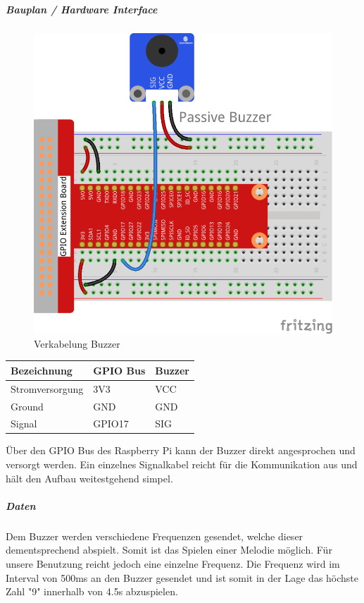 \documentclass[../../main.tex]{subfiles}
\begin{document}
\subparagraph{Bauplan / Hardware Interface}

\begin{figure}[H] \centering
  \includegraphics{VerkabelungAkustik}
  \caption{Verkabelung Buzzer}
  \label{fig:Buzzer}
\end{figure}

\begin{table}[] \centering
\begin{tabular}{lll}
Bezeichnung     & GPIO Bus & Buzzer \\ \hline
Stromversorgung & 3V3      & VCC    \\
Ground          & GND      & GND    \\
Signal          & GPIO17   & SIG
\end{tabular}
\end{table}

Über den GPIO Bus des Raspberry Pi kann der Buzzer direkt angesprochen und versorgt werden. Ein einzelnes Signalkabel reicht für die Kommunikation aus und hält den Aufbau weitestgehend simpel.

\subparagraph{Daten}
Dem Buzzer werden verschiedene Frequenzen gesendet, welche dieser dementsprechend abspielt. Somit ist das Spielen einer Melodie möglich. Für unsere Benutzung reicht jedoch eine einzelne Frequenz. Die Frequenz wird im Interval von 500ms an den Buzzer gesendet und ist somit in der Lage das höchste Zahl "9" innerhalb von 4.5s abzuspielen.
\end{document}
